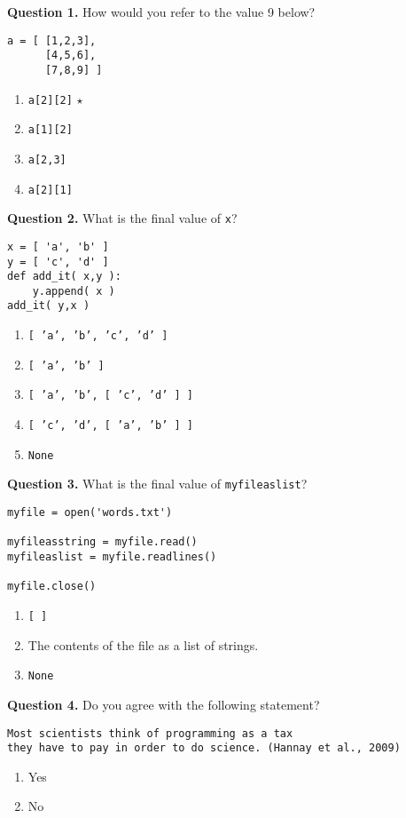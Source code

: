 \documentclass[12pt]{article}
\begin{document}


{\bf Question 1.}    How would you refer to the value 9 below?
\begin{lstlisting}[frame=single]
a = [ [1,2,3],
      [4,5,6],
      [7,8,9] ]
\end{lstlisting}
\vspace{-0.5cm}
  \begin{enumerate}[label=\Alph*]
   \item  \texttt{a[2][2]} $\star$
   \item  \texttt{a[1][2]}
   \item  \texttt{a[2,3]}
   \item  \texttt{a[2][1]}  
  \end{enumerate}

{\bf Question 2.}     What is the final value of \texttt{x}?
\begin{lstlisting}[frame=single]
x = [ 'a', 'b' ]
y = [ 'c', 'd' ]
def add_it( x,y ):
    y.append( x )
add_it( y,x )
\end{lstlisting}
\vspace{-0.5cm}
\begin{enumerate}[label=\Alph*]
  \item  \texttt{[ 'a', 'b', 'c', 'd' ]}
  \item  \texttt{[ 'a', 'b' ]}
  \item  \texttt{[ 'a', 'b', [ 'c', 'd' ] ]} %
  \item  \texttt{[ 'c', 'd', [ 'a', 'b' ] ]}
  \item  \texttt{None}
\end{enumerate}

{\bf Question 3.}  What is the final value of \texttt{myfileaslist}?
\begin{lstlisting}[frame=single]
myfile = open('words.txt')

myfileasstring = myfile.read()
myfileaslist = myfile.readlines()

myfile.close()
\end{lstlisting}
\vspace{-0.5cm}
\begin{enumerate}[label=\Alph*]
	 \item  \texttt{[ ]} %
	 \item  The contents of the file as a list of strings.
	 \item  \texttt{None}
\end{enumerate}

{\bf Question 4.}   Do you agree with the following statement?
\begin{lstlisting}[frame=single]
Most scientists think of programming as a tax 
they have to pay in order to do science. (Hannay et al., 2009)
\end{lstlisting}
\vspace{-0.5cm}
\begin{enumerate}[label=\Alph*]
  \item  Yes
  \item  No
\end{enumerate}
\end{document}
